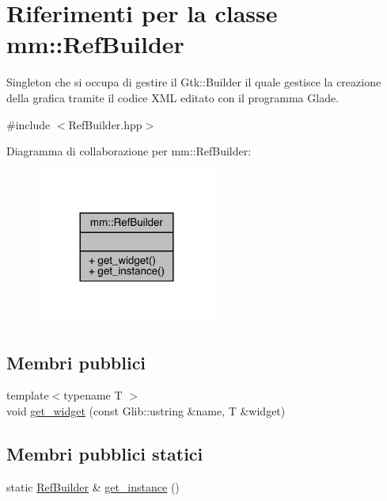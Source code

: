 \hypertarget{classmm_1_1_ref_builder}{}\section{Riferimenti per la classe mm\+:\+:Ref\+Builder}
\label{classmm_1_1_ref_builder}


Singleton che si occupa di gestire il Gtk\+::\+Builder il quale gestisce la creazione della grafica tramite il codice X\+ML editato con il programma Glade.  




{\ttfamily \#include $<$Ref\+Builder.\+hpp$>$}



Diagramma di collaborazione per mm\+:\+:Ref\+Builder\+:\nopagebreak
\begin{figure}[H]
\begin{center}
\leavevmode
\includegraphics[width=168pt]{d5/ddf/classmm_1_1_ref_builder__coll__graph}
\end{center}
\end{figure}
\subsection*{Membri pubblici}
\begin{DoxyCompactItemize}
\item 
{\footnotesize template$<$typename T $>$ }\\void \hyperlink{classmm_1_1_ref_builder_a67812973516cbeddf488360424685153}{get\+\_\+widget} (const Glib\+::ustring \&name, T \&widget)
\end{DoxyCompactItemize}
\subsection*{Membri pubblici statici}
\begin{DoxyCompactItemize}
\item 
static \hyperlink{classmm_1_1_ref_builder}{Ref\+Builder} \& \hyperlink{classmm_1_1_ref_builder_a1c46de2b1ff68aebfc85692a99827753}{get\+\_\+instance} ()
\end{DoxyCompactItemize}


